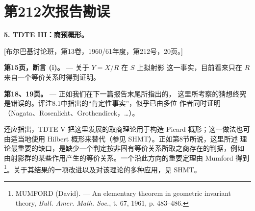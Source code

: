 \clearpage
\chapter*{第212次报告勘误}
\setcounter{footnote}{2}

\noindent\textbf{5. TDTE III：商预概形。}

\begin{center}
[布尔巴基讨论班，第13卷，1960/61年度，第212号，20页。]
\end{center}

\noindent\textbf{第15页，断言 (i)。} --- 关于 $Y=X/R$ 在 $S$ 上拟射影
这一事实，目前看来只在 $R$ 来自一个等价关系时得到证明。

\noindent\textbf{第18、19页。} --- 正如我们在下一篇报告末尾所指出的，
这里所考察的猜想终究是错误的。评注8.1中指出的“肯定性事实”，似乎已由多位
作者同时证明（Nagata、Rosenlicht、Grothendieck，\ldots）。

还应指出，TDTE V 把这里发展的取商理论用于构造 Picard 概形；这一做法也可
由适当地使用 Hilbert 概形来替代（参见 SHMT）。正如第8节所说，这里所述
理论最重要的缺口，是缺少一个判定按非固有等价关系所取之商存在的判据，例如
由射影群的某些作用产生的等价关系。一个沿此方向的重要定理由 Mumford
得到\footnote{MUMFORD (David). --- An elementary theorem in geometric
invariant theory, \emph{Bull. Amer. Math. Soc.}, t. 67, 1961,
p. 483--486.}。关于其结果的一项改进以及对该理论的多种应用，见 SHMT。

\par
